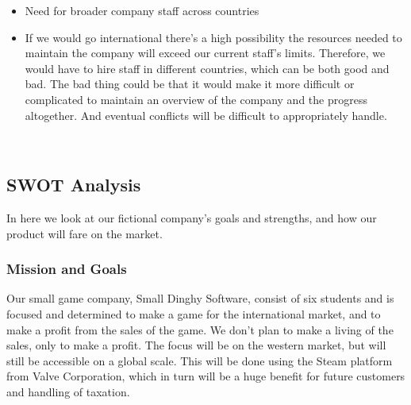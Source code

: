 	\begin{itemize}
		\item Need for broader company staff across countries
	\end{itemize}
	\begin{itemize}
	\item 	If we would go international there’s a high possibility the resources
   needed to maintain the company will exceed our current staff’s limits.
    Therefore, we would have to hire staff in different countries, which
    can be both good and bad. The bad thing could be that it would make
    it more difficult or complicated to maintain an overview of the company
     and the progress altogether. And eventual conflicts will be difficult
     to appropriately handle.
		 \end{itemize}
	\\
	\subsection{SWOT Analysis}
	In here we look at our fictional company’s goals and strengths, and how
   our product will fare on the market.
	\\
	\subsubsection{Mission and Goals}
	Our small game company, Small Dinghy Software, consist of six students
   and is focused and determined to make a game for the international market,
    and to make a profit from the sales of the game. We don’t plan to make a
     living of the sales, only to make a profit. The focus will be on the
     western market, but will still be accessible on a global scale. This
     will be done using the Steam platform from Valve Corporation, which
     in turn will be a huge benefit for future customers and handling of
     taxation.
	\\
